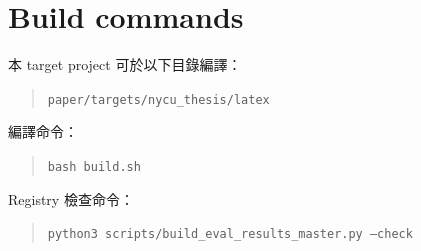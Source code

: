 \section{Build commands}

本 target project 可於以下目錄編譯：

\begin{quote}
\texttt{paper/targets/nycu\_thesis/latex}
\end{quote}

編譯命令：

\begin{quote}
\texttt{bash build.sh}
\end{quote}

Registry 檢查命令：

\begin{quote}
\texttt{python3 scripts/build\_eval\_results\_master.py --check}
\end{quote}

